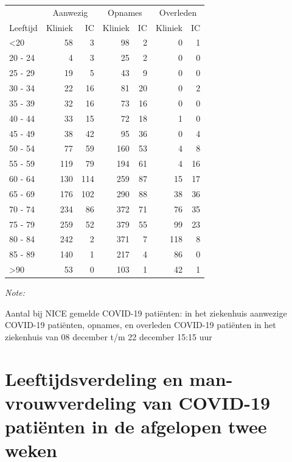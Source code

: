 \documentclass[
  english,
  man,floatsintext]{apa6}
\begin{document}
\begin{table}
\centering\begingroup\fontsize{10}{12}\selectfont

\begin{threeparttable}
\begin{tabular}{lrrrrrr}
\toprule
\multicolumn{1}{c}{ } & \multicolumn{2}{c}{Aanwezig} & \multicolumn{2}{c}{Opnames} & \multicolumn{2}{c}{Overleden} \\
\cmidrule(l{3pt}r{3pt}){2-3} \cmidrule(l{3pt}r{3pt}){4-5} \cmidrule(l{3pt}r{3pt}){6-7}
Leeftijd & Kliniek & IC & Kliniek & IC & Kliniek & IC\\
\midrule
<20 & 58 & 3 & 98 & 2 & 0 & 1\\
20 - 24 & 4 & 3 & 25 & 2 & 0 & 0\\
25 - 29 & 19 & 5 & 43 & 9 & 0 & 0\\
30 - 34 & 22 & 16 & 81 & 20 & 0 & 2\\
35 - 39 & 32 & 16 & 73 & 16 & 0 & 0\\
40 - 44 & 33 & 15 & 72 & 18 & 1 & 0\\
45 - 49 & 38 & 42 & 95 & 36 & 0 & 4\\
50 - 54 & 77 & 59 & 160 & 53 & 4 & 8\\
55 - 59 & 119 & 79 & 194 & 61 & 4 & 16\\
60 - 64 & 130 & 114 & 259 & 87 & 15 & 17\\
65 - 69 & 176 & 102 & 290 & 88 & 38 & 36\\
70 - 74 & 234 & 86 & 372 & 71 & 76 & 35\\
75 - 79 & 259 & 52 & 379 & 55 & 99 & 23\\
80 - 84 & 242 & 2 & 371 & 7 & 118 & 8\\
85 - 89 & 140 & 1 & 217 & 4 & 86 & 0\\
>90 & 53 & 0 & 103 & 1 & 42 & 1\\
\bottomrule
\end{tabular}
\begin{tablenotes}
\item \textit{Note: } 
\item Aantal bij NICE gemelde COVID-19 patiënten: in het ziekenhuis aanwezige COVID-19 patiënten, opnames, en overleden COVID-19 patiënten in het ziekenhuis van 08 december t/m 22 december 15:15 uur
\end{tablenotes}
\end{threeparttable}
\endgroup{}
\end{table}

\newpage

\hypertarget{leeftijdsverdeling-en-man-vrouwverdeling-van-covid-19-patiuxebnten-in-de-afgelopen-twee-weken}{%
\section{Leeftijdsverdeling en man-vrouwverdeling van COVID-19 patiënten in de afgelopen twee weken}\label{leeftijdsverdeling-en-man-vrouwverdeling-van-covid-19-patiuxebnten-in-de-afgelopen-twee-weken}}
\end{document}
